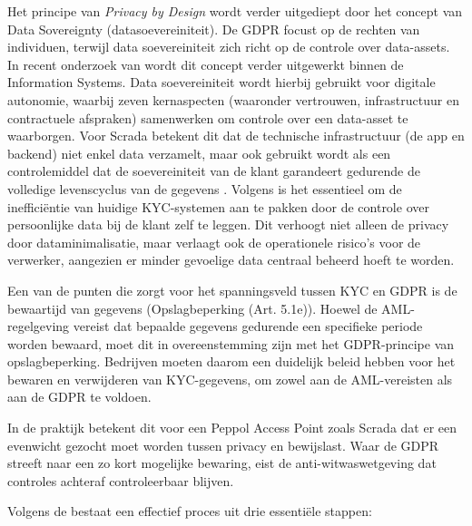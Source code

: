 Het principe van \textit{Privacy by Design} wordt verder uitgediept door het concept van Data Sovereignty (datasoevereiniteit). De GDPR focust op de rechten van individuen, terwijl data soevereiniteit zich richt op de controle over data-assets.
In recent onderzoek van \autocite{vonScherenberg2024} wordt dit concept verder uitgewerkt binnen de Information Systems. Data soevereiniteit wordt hierbij gebruikt
voor digitale autonomie, waarbij zeven kernaspecten (waaronder vertrouwen, infrastructuur en contractuele afspraken) samenwerken om controle over een data-asset te waarborgen. 
Voor Scrada betekent dit dat de technische infrastructuur (de app en backend) niet enkel data verzamelt, maar ook gebruikt wordt als een controlemiddel dat de soevereiniteit van de klant garandeert gedurende de volledige levenscyclus van de gegevens \autocite{vonScherenberg2024}.
Volgens \autocite{Kumar2020} is het essentieel om de inefficiëntie van huidige KYC-systemen aan te pakken door de controle over persoonlijke data bij de klant zelf te leggen. 
Dit verhoogt niet alleen de privacy door dataminimalisatie, maar verlaagt ook de operationele risico's voor de verwerker, aangezien er minder gevoelige data centraal beheerd hoeft te worden.

Een van de punten die zorgt voor het spanningsveld tussen KYC en GDPR is de bewaartijd van gegevens (Opslagbeperking (Art. 5.1e)).
Hoewel de AML-regelgeving vereist dat bepaalde gegevens gedurende een specifieke periode worden bewaard,
moet dit in overeenstemming zijn met het GDPR-principe van opslagbeperking.
Bedrijven moeten daarom een duidelijk beleid hebben voor het bewaren en verwijderen van KYC-gegevens, om zowel aan de AML-vereisten als aan de GDPR te voldoen.

In de praktijk betekent dit voor een Peppol Access Point zoals Scrada dat er een evenwicht gezocht moet worden tussen privacy en bewijslast. 
Waar de GDPR streeft naar een zo kort mogelijke bewaring, eist de anti-witwaswetgeving dat controles achteraf controleerbaar blijven. 

\label{sec:Het gestandaardiseerde KYC-proces}
\label{sec:kyc-proces}
Volgens de \autocite{LSEG2024} bestaat een effectief proces uit drie essentiële stappen: 

